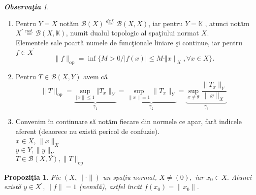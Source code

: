 \documentclass[ a4paper, 12pt]{report}
\newtheorem{prop}[theorem]{\bf Propozi\c tia }
\theoremstyle{definition}
\theoremstyle{remark}
\newtheorem{obs}{\bf Observa\c tia }[section]
\numberwithin{equation}{section}
\begin{document}
\begin{obs}
\begin{enumerate}
\item Pentru $Y = X$ not\u am $\mathcal{B}(X) \stackrel{def.}{=} \mathcal{B}(X,X)$, iar pentru $Y = \mathbb{K}$ , atunci not\u am $X^{'}\stackrel{not.}{=} \mathcal{B}(X,\mathbb{K})$, numit dualul topologic al spa\c tiului normat $X$.\\
Elementele sale poart\u a numele de func\c tionale liniare \c si continue, iar pentru $f \in X^{'}$ \[ \lVert f \rVert_{\mbox{op}} = \inf \{ M >0 / \lvert f(x) \rvert \leq M \cdot \Vert x \rVert_{X}, \forall x \in X\} .\]
\item Pentru $T \in \mathcal{B}(X,Y)$ avem c\u a 
\[ \lVert  T \rVert_{\mbox{op}} = \underbrace{\sup\limits_{\Vert x \rVert \leq 1} \Vert T_x \rVert_{Y}}_{\gamma_1} = \underbrace{\sup\limits_{\lVert x \rVert = 1} \lVert T_x \rVert_{Y}}_{\gamma_2} = \underbrace{\sup\limits_{x \neq \theta} \frac{\lVert T_x \rVert_{Y}}{\lVert x \rVert_{X}}}_{\gamma_3} \]
\item Convenim \^in continuare s\u a not\u am fiecare din normele ce apar, far\u a indicele aferent (deaorece nu exist\u a pericol de confuzie).\\
$x \in X$, $\lVert x \rVert_{X}$\\
$y \in Y, \lVert y \rVert_{Y}$\\
$T \in \mathcal{B}(X,Y), \lVert T \rVert_{\mbox{op}}$
\end{enumerate}
\end{obs}
\begin{prop}
Fie $(X, \lVert \cdot \rVert)$ un spa\c tiu normat, $X \neq (0),$ iar $x_0 \in X.$ Atunci exist\u a $y \in X^{'}, \lVert f \rVert = 1$ (nenul\u a), astfel \^inc\^at $f(x_0) = \lVert x_0 \rVert.$
\end{prop}
\end{document}
